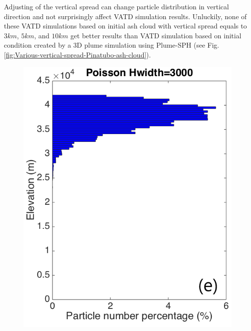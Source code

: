 \documentclass[draft,linenumbers]{agujournal2019}
\begin{document}
Adjusting of the vertical spread can change particle distribution in vertical direction and not surprisingly affect VATD simulation results. Unluckily, none of these VATD simulations based on initial ash cloud with vertical spread equals to $3km$, $5km$, and $10 km$ get better results than VATD simulation based on initial condition created by a 3D plume simulation using Plume-SPH (see Fig. \ref{fig:Various-vertical-spread-Pinatubo-ash-cloud}).

\begin{figure}[!htb]
\centering
\begin{minipage}{.325 \textwidth}
\centering
\includegraphics[width=0.99 \textwidth]{Figures/Possion-Hwidth3k-ParticleDis-z}
\end{minipage}%
\begin{minipage}{.325 \textwidth}
\centering

\end{minipage}
\end{figure}
\end{document}
